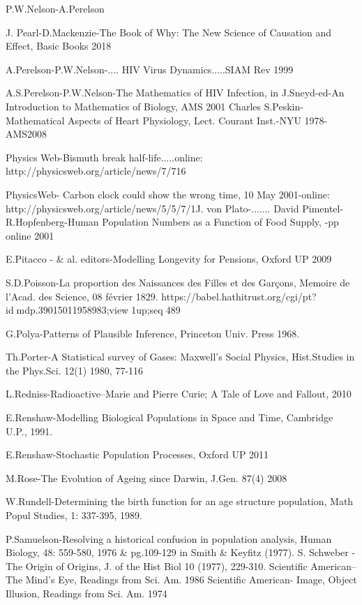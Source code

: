 P.W.Nelson-A.Perelson 

J. Pearl-D.Mackenzie-The Book of Why: The New Science of Causation and Effect, Basic Books 2018 

A.Perelson-P.W.Nelson-.... HIV Virus Dynamics.....SIAM Rev 1999 

A.S.Perelson-P.W.Nelson-The Mathematics of HIV Infection, in J.Sneyd-ed-An Introduction to Mathematics of Biology, AMS 2001 
Charles S.Peskin-Mathematical Aspects of Heart Physiology, Lect. Courant Inst.-NYU 1978- AMS2008

Physics Web-Bismuth break half-life.....online: http://physicsweb.org/article/news/7/716 

PhysicsWeb- Carbon clock could show the wrong time, 10 May 2001-online: http://physicsweb.org/article/news/5/5/7/1J. von Plato-....... David Pimentel-R.Hopfenberg-Human Population Numbers as a Function of Food Supply, -pp online 2001 

E.Pitacco - \& al. editors-Modelling Longevity for Pensions, Oxford UP 2009 

S.D.Poisson-La proportion des Naissances des Filles et des Garçons, Memoire de l’Acad. des Science, 08 février 1829. https://babel.hathitrust.org/cgi/pt?idmdp.39015011958983;view1up;seq489 

G.Polya-Patterns of Plausible Inference, Princeton Univ. Press 1968. 

Th.Porter-A Statistical survey of Gases: Maxwell’s Social Physics, Hist.Studies in the Phys.Sci. 12(1) 1980, 77-116 

L.Redniss-Radioactive–Marie and Pierre Curie; A Tale of Love and Fallout, 2010 

E.Renshaw-Modelling Biological Populations in Space and Time, Cambridge U.P., 1991. 

E.Renshaw-Stochastic Population Processes, Oxford UP 2011 

M.Rose-The Evolution of Ageing since Darwin, J.Gen. 87(4) 2008 

W.Rundell-Determining the birth function for an age structure population, Math Popul Studies, 1: 337-395, 1989. 

P.Samuelson-Resolving a historical confusion in population analysis, Human Biology, 48: 559-580, 1976 \& pg.109-129 in Smith \& Keyfitz (1977). S. Schweber - The Origin of Origins, J. of the Hist Biol 10 (1977), 229-310. 
Scientific American–The Mind’s Eye, Readings from Sci. Am. 1986 
Scientific American- Image, Object Illusion, Readings from Sci. Am. 1974 

